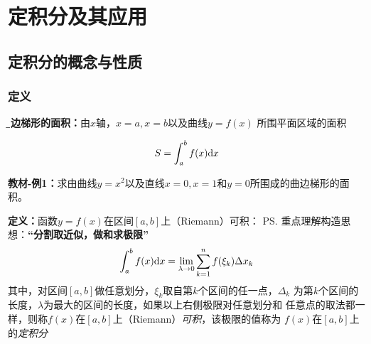 \setcounter{chapter}{5}

\chapter{定积分及其应用}

\section{定积分的概念与性质}

\subsection{定义}

{\bf\b 曲边梯形的面积：}由$x$轴，$x=a,x=b$以及曲线$y=f(x)$
所围平面区域的面积

\begin{center}
	
	$$S=\displaystyle\int_a^bf(x)\mathrm{d} x$$
\end{center}

{\bf 教材-例1：}求由曲线$y=x^2$以及直线$x=0,x=1$和$y=0$所围成的曲边梯形的面积。

{\bf 定义：}函数$y=f(x)$在区间$[a,b]$上（Riemann）可积：
\ps{重点理解构造思想：{\b\bf “分割取近似，做和求极限”}}
$$\displaystyle\int_a^bf(x)\mathrm{d} x=\lim\limits_{\lambda\to
0}\sum\limits_{k=1}^nf(\xi_k)\Delta x_k$$
其中，对区间$[a,b]$做任意划分，$\xi_k$取自第$k$个区间的任一点，$\Delta_k$
为第$k$个区间的长度，$\lambda$为最大的区间的长度，如果以上右侧极限对任意划分和
任意点的取法都一样，则称$f(x)$在$[a,b]$上（Riemann）{\it 可积}，该极限的值称为
$f(x)$在$[a,b]$上的{\it 定积分}

